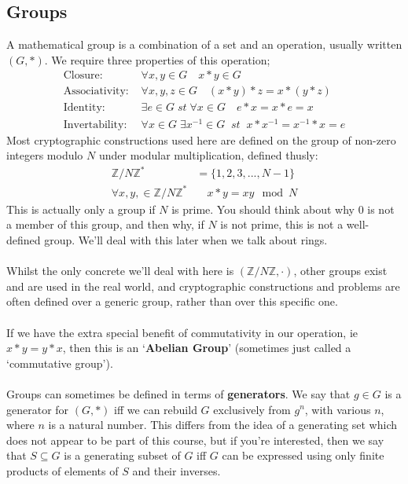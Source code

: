    \subsection{Groups}
    A mathematical group is a combination of a set and an operation, usually written $(G,*)$. We require three properties of this operation;
	\begin{align*}
		\mbox{Closure: } &\forall x,y \in G \quad x*y \in G\\
		\mbox{Associativity: } &\forall x,y,z \in G \quad (x*y)*z = x*(y*z)\\
		\mbox{Identity: } &\exists e \in G \; st \; \forall x \in G \quad e*x = x*e = x \\
		\mbox{Invertability: } &\forall x \in G \; \exists x^{-1} \in G \;\; st \;\; x*x^{-1} = x^{-1} * x = e
	\end{align*}
	Most cryptographic constructions used here are defined on the group of non-zero integers modulo $N$ under modular multiplication, defined thusly:
    \begin{align*}
        \mathbb{Z}/N\mathbb{Z}^{*} &= \{1, 2, 3, ... , N-1\} \\
        \forall x,y, \in \mathbb{Z}/N\mathbb{Z}^{*}& \quad x * y = xy \mod N
    \end{align*}
    This is actually only a group if $N$ is prime. You should think about why $0$ is not a member of this group, and then why, if $N$ is not prime, this is not a well-defined group. We'll deal with this later when we talk about rings.\\
\\
	Whilst the only concrete we'll deal with here is $(\mathbb{Z}/N\mathbb{Z} , \cdot)$, other groups exist and are used in the real world, and cryptographic constructions and problems are often defined over a generic group, rather than over this specific one.\\
\\
	If we have the extra special benefit of commutativity in our operation, ie $x*y = y*x$, then this is an `\textbf{Abelian Group}' (sometimes just called a `commutative group').\\
\\
    Groups can sometimes be defined in terms of \textbf{generators}. We say that $g \in G$ is a generator for $(G,*)$ iff we can rebuild $G$ exclusively from $g^n$, with various $n$, where $n$ is a natural number. This differs from the idea of a generating set which does not appear to be part of this course, but if you're interested, then we say that $S\subseteq G$ is a generating subset of $G$ iff $G$ can be expressed using only finite products of elements of $S$ and their inverses.

